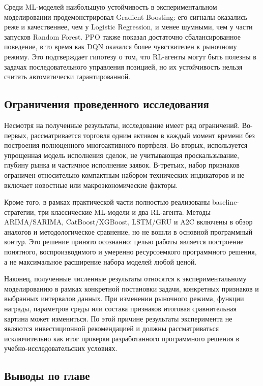 Среди ML-моделей наибольшую устойчивость в экспериментальном моделировании продемонстрировал Gradient Boosting: его сигналы оказались реже и качественнее, чем у Logistic Regression, и менее шумными, чем у части запусков Random Forest. PPO также показал достаточно сбалансированное поведение, в то время как DQN оказался более чувствителен к рыночному режиму. Это подтверждает гипотезу о том, что RL-агенты могут быть полезны в задачах последовательного управления позицией, но их устойчивость нельзя считать автоматически гарантированной.

\subsection{Ограничения проведенного исследования}

Несмотря на полученные результаты, исследование имеет ряд ограничений. Во-первых, рассматривается торговля одним активом в каждый момент времени без построения полноценного многоактивного портфеля. Во-вторых, используется упрощенная модель исполнения сделок, не учитывающая проскальзывание, глубину рынка и частичное исполнение заявок. В-третьих, набор признаков ограничен относительно компактным набором технических индикаторов и не включает новостные или макроэкономические факторы.

Кроме того, в рамках практической части полностью реализованы baseline-стратегии, три классические ML-модели и два RL-агента. Методы ARIMA/SARIMA, CatBoost/XGBoost, LSTM/GRU и A2C включены в обзор аналогов и методологическое сравнение, но не вошли в основной программный контур. Это решение принято осознанно: целью работы является построение понятного, воспроизводимого и умеренно ресурсоемкого программного решения, а не максимальное расширение набора моделей любой ценой.

Наконец, полученные численные результаты относятся к экспериментальному моделированию в рамках конкретной постановки задачи, конкретных признаков и выбранных интервалов данных. При изменении рыночного режима, функции награды, параметров среды или состава признаков итоговая сравнительная картина может измениться. По этой причине результаты эксперимента не являются инвестиционной рекомендацией и должны рассматриваться исключительно как итог проверки разработанного программного решения в учебно-исследовательских условиях.

\subsection{Выводы по главе}


